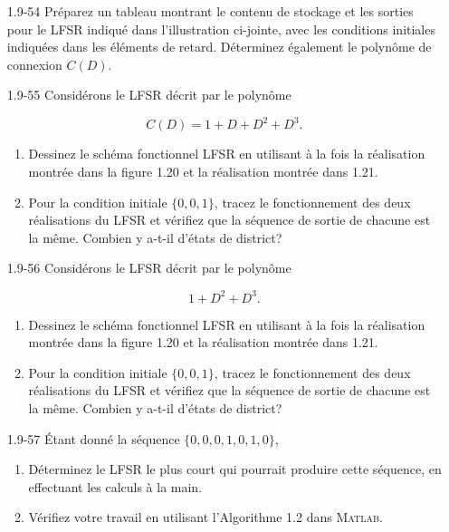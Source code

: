 \documentclass[10pt,twoside,a4paper]{book}
\begin{document}
\begin{enumerate}
  \item[1.9-54] Préparez un tableau montrant le contenu de stockage et les sorties pour le LFSR indiqué dans l'illustration ci-jointe, avec les conditions initiales indiquées dans les éléments de retard. Déterminez également le polynôme de connexion $C(D)$.

  \item[1.9-55] Considérons le LFSR décrit par le polynôme
  
  \begin{equation*}
    C(D) = 1 + D + D^2 + D^3.
  \end{equation*}

  \begin{enumerate}
    \item Dessinez le schéma fonctionnel LFSR en utilisant à la fois la réalisation montrée dans la figure 1.20 et la réalisation montrée dans 1.21.
    \item Pour la condition initiale $\{0, 0, 1\}$, tracez le fonctionnement des deux réalisations du LFSR et vérifiez que la séquence de sortie de chacune est la même. Combien y a-t-il d'états de district?
  \end{enumerate}

  \item[1.9-56] Considérons le LFSR décrit par le polynôme
  
  \begin{equation*}
    1 + D^2 + D^3.
  \end{equation*}

  \begin{enumerate}
    \item Dessinez le schéma fonctionnel LFSR en utilisant à la fois la réalisation montrée dans la figure 1.20 et la réalisation montrée dans 1.21.
    \item Pour la condition initiale $\{0, 0, 1\}$, tracez le fonctionnement des deux réalisations du LFSR et vérifiez que la séquence de sortie de chacune est la même. Combien y a-t-il d'états de district?
  \end{enumerate}

  \item[1.9-57] Étant donné la séquence $\{0, 0, 0, 1, 0, 1, 0\}$,
  
  \begin{enumerate}
    \item Déterminez le LFSR le plus court qui pourrait produire cette séquence, en effectuant les calculs à la main.
    \item Vérifiez votre travail en utilisant l'Algorithme 1.2 dans \textsc{Matlab}.
  \end{enumerate}


\end{enumerate}
\end{document}
